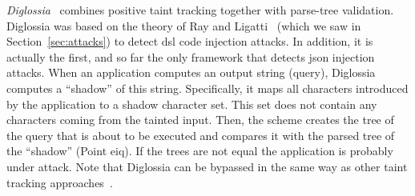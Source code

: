 \documentclass[conference]{IEEEtran}
\begin{document}
{\it Diglossia}~\cite{SMS13} combines positive taint tracking together
with parse-tree validation. Diglossia was based on the theory of Ray
and Ligatti~\cite{RL12b} (which we saw in Section~\ref{sec:attacks})
to detect {\sc dsl} code injection attacks. In addition, it is
actually the first, and so far the only framework that detects {\sc
  json} injection attacks. When an application computes an output
string (query), Diglossia computes a ``shadow'' of this string.
Specifically, it maps all characters introduced by the application to
a shadow character set. This set does not contain any characters
coming from the tainted input. Then, the scheme creates the tree of
the query that is about to be executed and compares it with the parsed
tree of the ``shadow'' (Point {\sc e}i{\sc q}). If the trees are not
equal the application is probably under attack. Note that Diglossia
can be bypassed in the same way as other taint tracking
approaches~\cite{NBR14}.
\end{document}
